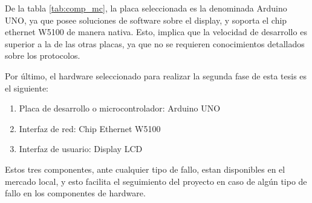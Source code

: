 \renewcommand{\arraystretch}{1.2}
\begin{table}[ht]
\caption{Cuadro comparativo de placas disponibles en el Instituto Argentino de radioastronomía}
\label{tab:comp_mc}
\end{table} 





De la tabla \ref{tab:comp_mc}, la placa seleccionada es la denominada Arduino UNO, ya que posee soluciones de software sobre el display, y soporta el chip ethernet W5100 de manera nativa. Esto, implica que la velocidad de desarrollo es superior a la de las otras placas, ya que no se requieren conocimientos detallados sobre los protocolos. 

Por último, el hardware seleccionado para realizar la segunda fase de esta tesis es el siguiente: 
\begin{enumerate}
	\item Placa de desarrollo o microcontrolador: Arduino UNO 
	\item Interfaz de red: Chip Ethernet W5100 
	\item Interfaz de usuario: Display LCD  
\end{enumerate}

Estos tres componentes, ante cualquier tipo de fallo, estan disponibles en el mercado local, y esto facilita el seguimiento del proyecto en caso de algún tipo de fallo en los componentes de hardware. 


